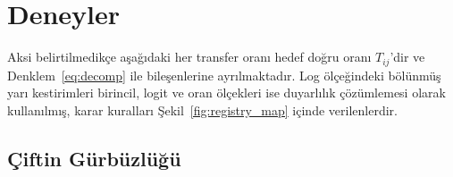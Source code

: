\section{Deneyler}
\label{sec:experiments}

Aksi belirtilmedikçe aşağıdaki her transfer oranı hedef doğru oranı $T_{ij}$'dir ve Denklem~\eqref{eq:decomp} ile bileşenlerine ayrılmaktadır. Log ölçeğindeki bölünmüş yarı kestirimleri birincil, logit ve oran ölçekleri ise duyarlılık çözümlemesi olarak kullanılmış, karar kuralları Şekil~\ref{fig:registry_map} içinde verilenlerdir.

\subsection{Çiftin Gürbüzlüğü}
\label{subsec:robustness}


